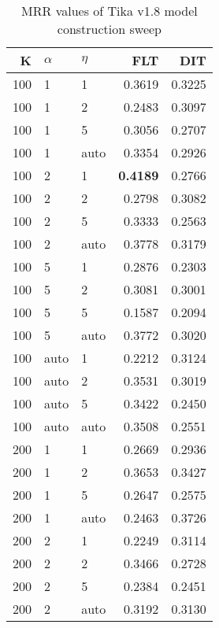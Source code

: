 
\begin{table}
\begin{spacing}{1.2}
\centering
\caption{MRR values of Tika v1.8 model construction sweep}
\label{table:tika_model_sweep}
\vspace{0.2em}
\parbox{.45\linewidth}{\centering \begin{tabular}{rll|rr}
\toprule
   K & $\alpha$ &   $\eta$ & FLT & DIT \\
\midrule
 100 &     1 &     1 &           0.3619 & 0.3225 \\
 100 &     1 &     2 &           0.2483 & 0.3097 \\
 100 &     1 &     5 &           0.3056 & 0.2707 \\
 100 &     1 &  auto &           0.3354 & 0.2926 \\
 100 &     2 &     1 &     {\bf 0.4189} & 0.2766 \\
 100 &     2 &     2 &           0.2798 & 0.3082 \\
 100 &     2 &     5 &           0.3333 & 0.2563 \\
 100 &     2 &  auto &           0.3778 & 0.3179 \\
 100 &     5 &     1 &           0.2876 & 0.2303 \\
 100 &     5 &     2 &           0.3081 & 0.3001 \\
 100 &     5 &     5 &           0.1587 & 0.2094 \\
 100 &     5 &  auto &           0.3772 & 0.3020 \\
 100 &  auto &     1 &           0.2212 & 0.3124 \\
 100 &  auto &     2 &           0.3531 & 0.3019 \\
 100 &  auto &     5 &           0.3422 & 0.2450 \\
 100 &  auto &  auto &           0.3508 & 0.2551 \\
 200 &     1 &     1 &           0.2669 & 0.2936 \\
 200 &     1 &     2 &           0.3653 & 0.3427 \\
 200 &     1 &     5 &           0.2647 & 0.2575 \\
 200 &     1 &  auto &           0.2463 & 0.3726 \\
 200 &     2 &     1 &           0.2249 & 0.3114 \\
 200 &     2 &     2 &           0.3466 & 0.2728 \\
 200 &     2 &     5 &           0.2384 & 0.2451 \\
 200 &     2 &  auto &           0.3192 & 0.3130 \\

\end{tabular}}
\end{spacing}
\end{table}

